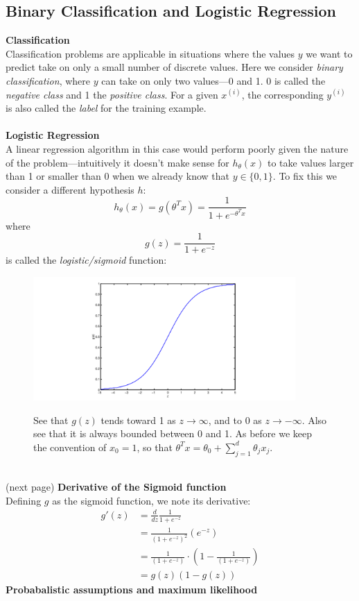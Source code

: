 \documentclass{report}
\begin{document}
\subsection{Binary Classification and Logistic Regression}
\textbf{Classification}\\
Classification problems are applicable in situations where the values $y$ we want to predict
take on only a small number of discrete values. Here we consider \textit{binary classification}, where 
$y$ can take on only two values---0 and 1. 0 is called
the \textit{negative class} and 1 the \textit{positive class}. For a given $x^{(i)}$, the corresponding 
$y^{(i)}$ is also called the \textit{label} for the training example.\\
\vspace{1mm}\\
\textbf{Logistic Regression}\\
A linear regression algorithm in this case would perform poorly given the nature of the problem---intuitively
it doesn't make sense for $h_\theta(x)$ to take values larger than 1 or smaller than 0 when
we already know that $y\in\{0,1\}$. To fix this we consider a different hypothesis $h$:
\begin{equation*}
h_\theta(x)=g(\theta^Tx)=\frac{1}{1+e^{-\theta^Tx}}
\end{equation*}
where 
\begin{equation*}
g(z)=\frac{1}{1+e^{-z}}
\end{equation*}
is called the \textit{logistic/sigmoid} function:
\begin{figure}[h]
\begin{center}
\includegraphics[width=10cm]{1}\\
\end{center}
See that $g(z)$ tends toward 1 as $z\to\infty$, and to 0 as $z\to-\infty$. Also see
that it is always bounded between 0 and 1. As before we keep the convention of $x_0=1$, so that
$\theta^Tx=\theta_0+\sum^d_{j=1}\theta_jx_j$.
\end{figure}\\
(next page)
\newpage
\noindent\textbf{Derivative of the Sigmoid function}\\
Defining $g$ as the sigmoid function, we note its derivative:
\begin{align*}
g'(z)&=\frac{d}{dz}\frac{1}{1+e^{-z}}\\
&=\frac{1}{(1+e^{-z})^2}(e^{-z})\\
&=\frac{1}{(1+e^{-z})}\cdot\left(1-\frac{1}{(1+e^{-z})}\right)\\
&=g(z)(1-g(z))
\end{align*}
\textbf{Probabalistic assumptions and maximum likelihood}
\end{document}
